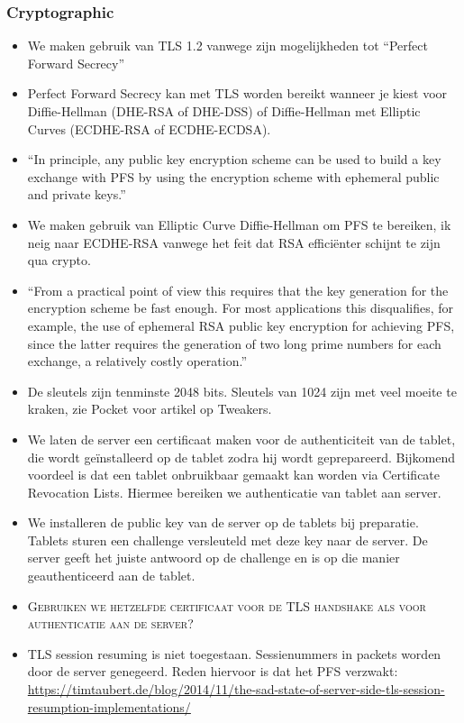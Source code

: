 \subsubsection{Cryptographic}
\begin{itemize}
  \item We maken gebruik van TLS 1.2 vanwege zijn mogelijkheden tot ``Perfect Forward Secrecy''
  \item Perfect Forward Secrecy kan met TLS worden bereikt wanneer je kiest voor Diffie-Hellman (DHE-RSA of DHE-DSS) of Diffie-Hellman met Elliptic Curves (ECDHE-RSA of ECDHE-ECDSA).
  \item ``In principle, any public key encryption scheme can be used to build a key exchange with PFS by using the encryption scheme with ephemeral public and private keys.''~\cite{PFS}
  \item We maken gebruik van Elliptic Curve Diffie-Hellman om PFS te bereiken, ik neig naar ECDHE-RSA vanwege het feit dat RSA efficiënter schijnt te zijn qua crypto.
  \item ``From a practical point of view this requires that the key generation for the encryption scheme be fast enough. For most applications this disqualifies, for example, the use of ephemeral RSA public key encryption for achieving PFS, since the latter requires the generation of two long prime numbers for each exchange, a relatively costly operation.''~\cite{PFS}
  \item De sleutels zijn tenminste 2048 bits. Sleutels van 1024 zijn met veel moeite te kraken, zie Pocket voor artikel op Tweakers.
  \item We laten de server een certificaat maken voor de authenticiteit van de tablet, die wordt geïnstalleerd op de tablet zodra hij wordt geprepareerd. Bijkomend voordeel is dat een tablet onbruikbaar gemaakt kan worden via Certificate Revocation Lists. Hiermee bereiken we authenticatie van tablet aan server.
  \item We installeren de public key van de server op de tablets bij preparatie. Tablets sturen een challenge versleuteld met deze key naar de server. De server geeft het juiste antwoord op de challenge en is op die manier geauthenticeerd aan de tablet.
  \item \textsc{Gebruiken we hetzelfde certificaat voor de TLS handshake als voor authenticatie aan de server?}
  \item TLS session resuming is niet toegestaan. Sessienummers in packets worden door de server genegeerd. Reden hiervoor is dat het PFS verzwakt: \url{https://timtaubert.de/blog/2014/11/the-sad-state-of-server-side-tls-session-resumption-implementations/}

\end{itemize}
